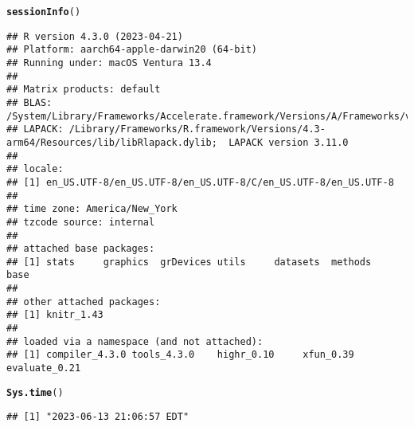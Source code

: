 \documentclass{article}\usepackage[]{graphicx}\usepackage[]{xcolor}
\makeatletter
\newcommand{\hlstd}[1]{\textcolor[rgb]{0.345,0.345,0.345}{#1}}%
\newcommand{\hlkwd}[1]{\textcolor[rgb]{0.737,0.353,0.396}{\textbf{#1}}}%
\newenvironment{kframe}{%
 \def\at@end@of@kframe{}%
 \ifinner\ifhmode%
  \def\at@end@of@kframe{\end{minipage}}%
  \begin{minipage}{\columnwidth}%
 \fi\fi%
 \def\FrameCommand##1{\hskip\@totalleftmargin \hskip-\fboxsep
 \colorbox{shadecolor}{##1}\hskip-\fboxsep
     \hskip-\linewidth \hskip-\@totalleftmargin \hskip\columnwidth}%
 \MakeFramed {\advance\hsize-\width
   \@totalleftmargin\z@ \linewidth\hsize
   \@setminipage}}%
 {\par\unskip\endMakeFramed%
 \at@end@of@kframe}
\newenvironment{knitrout}{}{} %
\makeatother
\begin{document}
\begin{knitrout}
\color{fgcolor}\begin{kframe}
\begin{alltt}
\hlkwd{sessionInfo}\hlstd{()}
\end{alltt}
\begin{verbatim}
## R version 4.3.0 (2023-04-21)
## Platform: aarch64-apple-darwin20 (64-bit)
## Running under: macOS Ventura 13.4
## 
## Matrix products: default
## BLAS:   /System/Library/Frameworks/Accelerate.framework/Versions/A/Frameworks/vecLib.framework/Versions/A/libBLAS.dylib 
## LAPACK: /Library/Frameworks/R.framework/Versions/4.3-arm64/Resources/lib/libRlapack.dylib;  LAPACK version 3.11.0
## 
## locale:
## [1] en_US.UTF-8/en_US.UTF-8/en_US.UTF-8/C/en_US.UTF-8/en_US.UTF-8
## 
## time zone: America/New_York
## tzcode source: internal
## 
## attached base packages:
## [1] stats     graphics  grDevices utils     datasets  methods   base     
## 
## other attached packages:
## [1] knitr_1.43
## 
## loaded via a namespace (and not attached):
## [1] compiler_4.3.0 tools_4.3.0    highr_0.10     xfun_0.39      evaluate_0.21
\end{verbatim}
\begin{alltt}
\hlkwd{Sys.time}\hlstd{()}
\end{alltt}
\begin{verbatim}
## [1] "2023-06-13 21:06:57 EDT"
\end{verbatim}
\end{kframe}
\end{knitrout}
\end{document}
